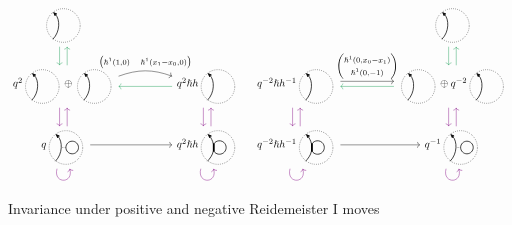\documentclass{article}
\theoremstyle{plain} %
\theoremstyle{definition} %
\theoremstyle{remark} %
\begin{document}
\begin{figure}
	\centering
	\[\label{r1}
	\begin{tikzcd}[column sep=1.8cm, ampersand replacement=\&]
		\scalebox{0.7}{\SingleEdge{}{}}  
		\arrow[d, color=ForestGreen, shift right=1.5] 
		\& \\
		q^2\scalebox{0.7}{\SingleEdge{}{}}\oplus \scalebox{0.7}{\SingleEdge{}{}}  
		\arrow[u, color=ForestGreen, shift right=1.5] 
		\arrow[d, color=violet, shift right=1.5] 
		\arrow[r, "{\begin{pmatrix}\hslash^1(1,0) & \hslash^1(x_1-x_0,0) \end{pmatrix}}", shift left=3, bend left=20, start anchor=east, end anchor=west]
		\&
		q^2\hslash h\scalebox{0.7}{\SingleEdge{}{}} 
		\arrow[d, color=violet, shift right=1.5]
		\arrow[l, color=ForestGreen, shift left=1]
		\\
		q\scalebox{0.7}{\ThinEdgeAndCircle{}{}{}} \arrow[r]
		\arrow[u, color=violet, shift right=1.5] 
		\arrow[loop right, distance=1.5em, in=-75, out=-105, color=violet]
		\&
		q^2\hslash h\scalebox{0.7}{\ThickEdgeAndCircle{}{}{}} 
		\arrow[u, color=violet, shift right=1.5] 
		\arrow[loop right, distance=1.5em, in=-75, out=-105, color=violet] 
	\end{tikzcd} 
	\quad
	\begin{tikzcd}[column sep=1.8cm]
		& 
		\scalebox{0.7}{\SingleEdge{}{}}  
		\arrow[d, color=ForestGreen, shift right=1.5] 
		\\
		q^{-2}\hslash h^{-1}\scalebox{0.7}{\SingleEdge{}{}}   \arrow[d, color=violet, shift right=1.5] 
		\ar[r, "{\begin{pmatrix}\hslash^1(0,x_0-x_1) \\\hslash^1(0,-1)
		\end{pmatrix}}", shift left=1] 
		&
		\scalebox{0.7}{\SingleEdge{}{}}\oplus q^{-2}\scalebox{0.7}{\SingleEdge{}{}} 
		\arrow[d, color=violet, shift right=1.5]
		\arrow[u, color=ForestGreen, shift right=1.5] 
		\ar[l, color=ForestGreen, shift left=1] 
		\\
		q^{-2}\hslash h^{-1}\scalebox{0.7}{\ThickEdgeAndCircle{}{}{}} 
		\ar[r] 
		\arrow[u, color=violet, shift right=1.5] 
		\arrow[loop right, distance=1.5em, in=-75, out=-105, color=violet] 
		&
		q^{-1}\scalebox{0.7}{\ThinEdgeAndCircle{}{}{}} 
		\arrow[u, color=violet, shift right=1.5] 
		\arrow[loop right, distance=1.5em, in=-75, out=-105, color=violet]
	\end{tikzcd}
	\]
	\caption{Invariance under positive and negative Reidemeister I moves}
	\label{fig:R1}
\end{figure}
\end{document}
